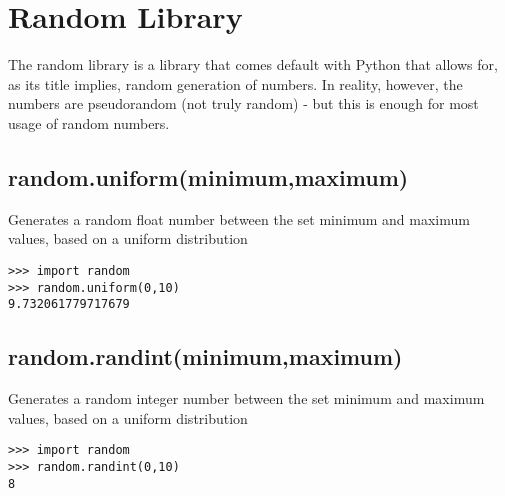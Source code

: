 \chapter{Random Library}



The random library is a library that comes default with Python that
allows for, as its title implies, random generation of numbers. In
reality, however, the numbers are pseudorandom (not truly random)
- but this is enough for most usage of random numbers.


\section{random.uniform(minimum,maximum)}

Generates a random float number between the set minimum and maximum
values, based on a uniform distribution

\begin{verbatim}
>>> import random 
>>> random.uniform(0,10) 
9.732061779717679
\end{verbatim}



\section{random.randint(minimum,maximum)}

Generates a random integer number between the set minimum and maximum
values, based on a uniform distribution

\begin{verbatim}
>>> import random
>>> random.randint(0,10)
8
\end{verbatim}

